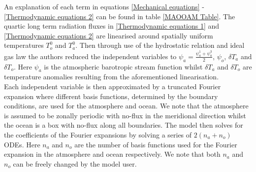 \noindent An explanation of each term in equations \ref{Mechanical equations} - \ref{Thermodynamic equations 2} can be found in table \ref{MAOOAM Table}. The quartic long term radiation fluxes in \ref{Thermodynamic equations 1} and \ref{Thermodynamic equations 2} are linearised around spatially uniform temperatures $T_o^0$ and $T_a^0$. Then through use of the hydrostatic relation and ideal gas law the authors reduced the independent variables to $\psi_a = \frac{\psi_a^1 + \psi_a^3}{2}$, $\psi_o$, $\delta T_a$ and $\delta T_o$. Here $\psi_a$ is the atmospheric barotropic stream function whilst $\delta T_a$ and $\delta T_o$ are temperature anomalies resulting from the aforementioned linearisation.\\

\noindent Each independent variable is then approximated by a truncated Fourier expansion where different basis functions, determined by the boundary conditions, are used for the atmosphere and ocean. We note that the atmosphere is assumed to be zonally periodic with no-flux in the meridional direction whilst the ocean is a box with no-flux along all boundaries.  The model then solves for the coefficients of the Fourier expansions by solving a series of $2(n_a + n_o)$ ODEs. Here $n_a$ and $n_o$ are the number of basis functions used for the Fourier expansion in the atmosphere and ocean respectively. We note that both $n_a$ and $n_o$ can be freely changed by the model user.

